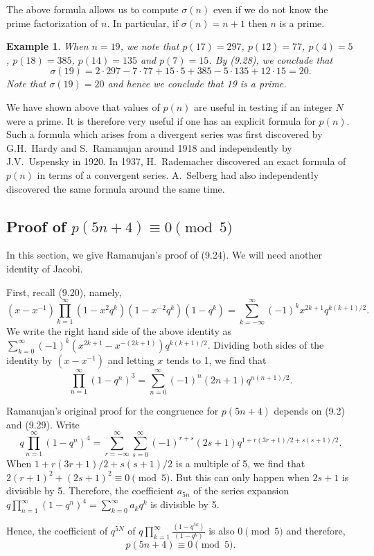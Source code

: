 \documentclass{article}
\newtheorem{example}[theorem]{Example}
\begin{document}
The above formula allows us to compute $\sigma(n)$ even if we do not know the prime
factorization of $n$. In particular, if $\sigma(n) = n+1$ then $n$ is a prime.

\begin{example}
When $n = 19$, we note that $p(17) = 297$, $p(12) = 77$, $p(4) = 5$,
$p(18) = 385$, $p(14) = 135$ and $p(7) = 15$. By (9.28), we conclude that
\[
\sigma(19) = 2 \cdot 297 - 7 \cdot 77 + 15 \cdot 5 + 385 - 5 \cdot 135 + 12 \cdot 15 = 20.
\]
Note that $\sigma(19) = 20$ and hence we conclude that 19 is a prime.
\end{example}

We have shown above that values of $p(n)$ are useful in testing if an integer $N$
were a prime. It is therefore very useful if one has an explicit formula for $p(n)$.
Such a formula which arises from a divergent series was first discovered by G.H.\
Hardy and S.\ Ramanujan around 1918 and independently by J.V.\ Uspensky in
1920. In 1937, H.\ Rademacher discovered an exact formula of $p(n)$ in terms of a
convergent series. A.\ Selberg had also independently discovered the same formula
around the same time.

\subsection{Proof of $p(5n+4) \equiv 0 \pmod{5}$}

In this section, we give Ramanujan's proof of (9.24). We will need another identity
of Jacobi.

First, recall (9.20), namely,
\[
(x - x^{-1})\prod_{k=1}^{\infty}(1-x^2 q^k)(1-x^{-2}q^k)(1-q^k) = \sum_{k=-\infty}^{\infty}(-1)^k x^{2k+1} q^{k(k+1)/2}.
\]
We write the right hand side of the above identity as
$\sum_{k=0}^{\infty}(-1)^k(x^{2k+1} - x^{-(2k+1)}) q^{k(k+1)/2}$.
Dividing both sides of the identity by $(x - x^{-1})$ and letting $x$ tends to 1, we find that
\begin{equation}
\prod_{n=1}^{\infty}(1-q^n)^3 = \sum_{n=0}^{\infty}(-1)^n(2n+1) q^{n(n+1)/2}.
\tag{9.29}
\end{equation}

Ramanujan's original proof for the congruence for $p(5n+4)$ depends on (9.2) and (9.29). Write
\[
q\prod_{n=1}^{\infty}(1-q^n)^4 = \sum_{r=-\infty}^{\infty}\sum_{s=0}^{\infty}(-1)^{r+s}(2s+1) q^{1+r(3r+1)/2+s(s+1)/2}.
\]
When $1 + r(3r+1)/2 + s(s+1)/2$ is a multiple of 5, we find that
$2(r+1)^2 + (2s+1)^2 \equiv 0 \pmod{5}$.
But this can only happen when $2s+1$ is divisible by 5. Therefore, the coefficient
$a_{5n}$ of the series expansion
$q\prod_{n=1}^{\infty}(1-q^n)^4 = \sum_{k=0}^{\infty} a_k q^k$
is divisible by 5.

Hence, the coefficient of $q^{5N}$ of
$q\prod_{k=1}^{\infty}\frac{(1-q^{5k})}{(1-q^k)}$
is also $0 \pmod{5}$ and therefore,
\[
p(5n+4) \equiv 0 \pmod{5}.
\]
\end{document}
